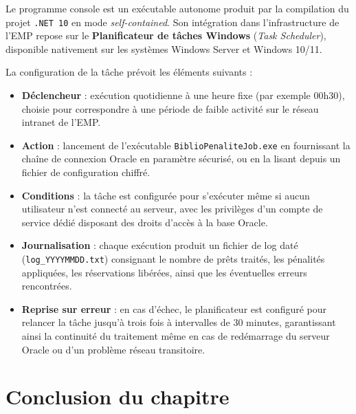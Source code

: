 Le programme console est un exécutable autonome produit par la compilation
du projet \texttt{.NET\,10} en mode \emph{self-contained}. Son intégration
dans l'infrastructure de l'EMP repose sur le \textbf{Planificateur de tâches
Windows} (\emph{Task Scheduler}), disponible nativement sur les systèmes
Windows Server et Windows 10/11.

La configuration de la tâche prévoit les éléments suivants :

\begin{itemize}
    \item \textbf{Déclencheur} : exécution quotidienne à une heure fixe
    (par exemple 00h30), choisie pour correspondre à une période de faible
    activité sur le réseau intranet de l'EMP.

    \item \textbf{Action} : lancement de l'exécutable
    \texttt{BiblioPenaliteJob.exe} en fournissant la chaîne de connexion
    Oracle en paramètre sécurisé, ou en la lisant depuis un fichier de
    configuration chiffré.

    \item \textbf{Conditions} : la tâche est configurée pour s'exécuter
    même si aucun utilisateur n'est connecté au serveur, avec les privilèges
    d'un compte de service dédié disposant des droits d'accès à la base Oracle.

    \item \textbf{Journalisation} : chaque exécution produit un fichier de
    log daté (\texttt{log\_YYYYMMDD.txt}) consignant le nombre de prêts
    traités, les pénalités appliquées, les réservations libérées, ainsi que
    les éventuelles erreurs rencontrées.

    \item \textbf{Reprise sur erreur} : en cas d'échec, le planificateur est
    configuré pour relancer la tâche jusqu'à trois fois à intervalles de
    30 minutes, garantissant ainsi la continuité du traitement même en cas de
    redémarrage du serveur Oracle ou d'un problème réseau transitoire.
\end{itemize}



\FloatBarrier

\section*{Conclusion du chapitre}

